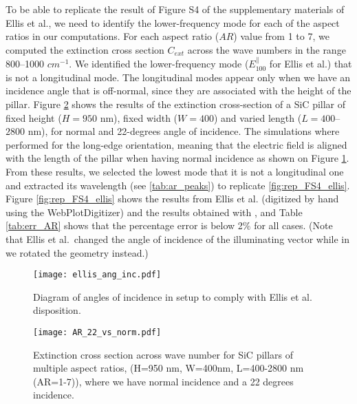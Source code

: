 To be able to replicate the result of Figure S4 of the supplementary materials of Ellis et al., we
need to identify the lower-frequency mode for each of
the aspect ratios in our computations. For each aspect ratio ($AR$) 
value from 1 to 7, we computed the extinction cross section $C_{ext}$ across the wave numbers in the range
800--1000 $cm^{-1}$. We identified the lower-frequency mode ($E^{\parallel}_{100}$ for Ellis et al.) that is not a 
longitudinal mode. The longitudinal modes appear only when we have an incidence angle that is off-normal, since 
they are associated with the height of the pillar. Figure \ref{fig:AR_22_vs_norm} shows the results of the extinction 
cross-section of a SiC pillar of fixed height ($H=950$ nm), fixed width ($W=400$) and varied length ($L=400$--$2800$ nm), for normal 
and 22-degrees angle of incidence. The simulations where performed 
for the long-edge orientation, meaning that the electric field is aligned with the length of the pillar 
when having normal incidence as shown on Figure \ref{fig:ellis_ang_inc}. From these results, we selected 
the lowest mode that it is not a longitudinal one and extracted its wavelength (see \ref{tab:ar_peaks}) to replicate 
\ref{fig:rep_FS4_ellis}. Figure \ref{fig:rep_FS4_ellis} shows the results from  Ellis et al. (digitized by hand using the WebPlotDigitizer) and the results obtained
with \pygbe, and Table \ref{tab:err_AR} shows that the percentage error is below 2$\%$ for all cases.
(Note that Ellis et al.\ changed the angle of incidence of the illuminating vector while in \pygbe we 
rotated the geometry instead.) 

\begin{figure}
    \centering
    \texttt{[image: ellis\_ang\_inc.pdf]} 
    \caption{Diagram of angles of incidence in \pygbe setup to comply with Ellis et al. disposition.}
    \label{fig:ellis_ang_inc}
 \end{figure}


\begin{figure}
    \centering
    \texttt{[image: AR\_22\_vs\_norm.pdf]} 
    \caption{Extinction cross section across wave number for SiC pillars of multiple aspect ratios,  
             (H=950 nm, W=400nm, L=400-2800 nm (AR=1-7)), where we have normal incidence and a 
             22 degrees incidence.
            }
    \label{fig:AR_22_vs_norm}
 \end{figure}


